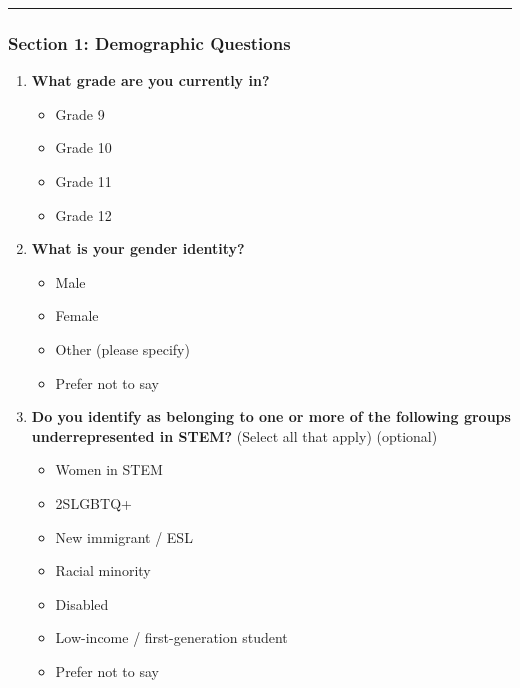 \documentclass[
  letterpaper,
  DIV=11,
  numbers=noendperiod]{scrartcl}
\providecommand{\tightlist}{%
  \setlength{\itemsep}{0pt}\setlength{\parskip}{0pt}}\usepackage{longtable,booktabs,array}
\begin{document}
\begin{center}\rule{0.5\linewidth}{0.5pt}\end{center}

\subsubsection{Section 1: Demographic
Questions}\label{section-1-demographic-questions}

\begin{enumerate}
\def\labelenumi{\arabic{enumi}.}
\tightlist
\item
  \textbf{What grade are you currently in?}

  \begin{itemize}
  \tightlist
  \item
    Grade 9\\
  \item
    Grade 10\\
  \item
    Grade 11\\
  \item
    Grade 12
  \end{itemize}
\item
  \textbf{What is your gender identity?}

  \begin{itemize}
  \tightlist
  \item
    Male\\
  \item
    Female\\
  \item
    Other (please specify)\\
  \item
    Prefer not to say
  \end{itemize}
\item
  \textbf{Do you identify as belonging to one or more of the following
  groups underrepresented in STEM?} (Select all that apply) (optional)

  \begin{itemize}
  \tightlist
  \item
    Women in STEM\\
  \item
    2SLGBTQ+\\
  \item
    New immigrant / ESL\\
  \item
    Racial minority\\
  \item
    Disabled\\
  \item
    Low-income / first-generation student\\
  \item
    Prefer not to say
  \end{itemize}
\end{enumerate}
\end{document}
